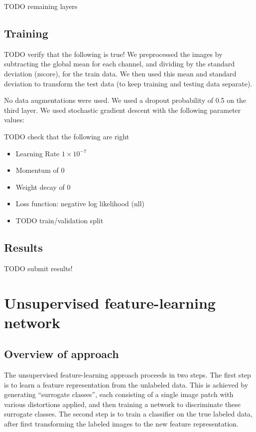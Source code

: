 \documentclass{article} %
\newenvironment{itemizedense}{
\begin{itemize}
  \setlength{\itemsep}{1pt}
  \setlength{\parskip}{0pt}
  \setlength{\parsep}{0pt}
}{\end{itemize}}
\begin{document}
TODO remaining layers

\subsection{Training}

TODO verify that the following is true!
We preprocessed the images by subtracting the global mean for each channel, and dividing by the standard deviation (zscore), for the train data. We then used this mean and standard deviation to transform the test data (to keep training and testing data separate).

No data augmentations were used. We used a dropout probability of 0.5 on the third layer. We used stochastic gradient descent with the following parameter values:

TODO check that the following are right

\begin{itemizedense}
\item Learning Rate $1 \times 10^{-7}$
\item Momentum of $0$
\item Weight decay of $0$
\item Loss function: negative log likelihood (nll)
\item TODO train/validation split
\end{itemizedense}

\subsection{Results}

TODO submit results!

\section{Unsupervised feature-learning network}

\subsection{Overview of approach}

The unsupervised feature-learning approach proceeds in two steps. The first step is to learn a feature representation from the unlabeled data. This is achieved by generating ``surrogate classes'', each consisting of a single image patch with various distortions applied, and then training a network to discriminate these surrogate classes. The second step is to train a classifier on the true labeled data, after first transforming the labeled images to the new feature representation.
\end{document}
